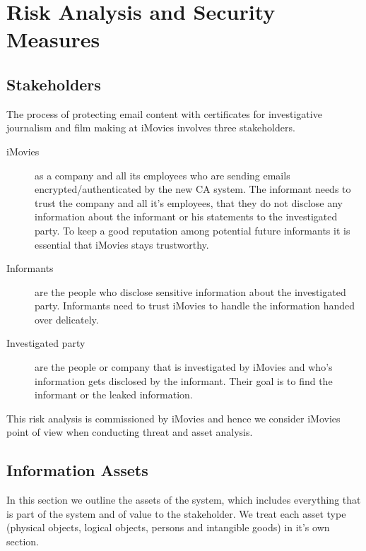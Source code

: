 \documentclass[a4paper, toc=index, 12pt, DIV14, twoside, BCOR2cm, headsepline, numbers=noenddot, bibliography=totoc]{report}
\begin{document}
\chapter{Risk Analysis and Security Measures}
\section{Stakeholders}
The process of protecting email content with certificates for investigative journalism and film making at iMovies involves three stakeholders.
\begin{description}
\item[iMovies] as a company and all its employees who are sending emails encrypted/authenticated by the new CA system. The informant needs to trust the company and all it's employees, that they do not disclose any information about the informant or his statements to the investigated party. To keep a good reputation among potential future informants it is essential that iMovies stays trustworthy.
\item[Informants] are the people who disclose sensitive information about the investigated party. Informants need to trust iMovies to handle the information handed over delicately.
\item[Investigated party] are the people or company that is investigated by iMovies and who's information gets disclosed by the informant. Their goal is to find the informant or the leaked information.
\end{description}
This risk analysis is commissioned by iMovies and hence we consider iMovies point of view when conducting threat and asset analysis.

\section{Information Assets}
In this section we outline the assets of the system, which includes everything that is part of the system and of value to the stakeholder. We treat each asset type (physical objects, logical objects, persons and intangible goods) in it's own section.
\end{document}
